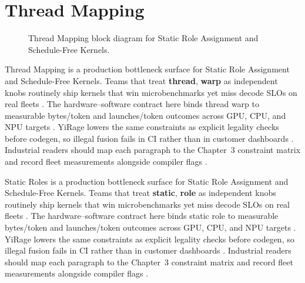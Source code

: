 \section{Thread Mapping}
\label{sec:thread_mapping}
\begin{figure}[t]
\centering
{}
\caption{Thread Mapping block diagram for Static Role Assignment and Schedule-Free Kernels.}
\label{fig:thread_mapping_architecture}
\end{figure}


Thread Mapping is a production bottleneck surface for Static Role Assignment and Schedule-Free Kernels. Teams that treat \textbf{thread}, \textbf{warp} as independent knobs routinely ship kernels that win microbenchmarks yet miss decode SLOs on real fleets \citep{taxbreak2026,semianalysis2024tma}. The hardware--software contract here binds thread warp to measurable bytes/token and launches/token outcomes across GPU, CPU, and NPU targets \citep{memoryfloor2026,amd2024xdna}. YiRage lowers the same constraints as explicit legality checks before codegen, so illegal fusion fails in CI rather than in customer dashboards \citep{nvidia2022hopper,amd2024aie}. Industrial readers should map each paragraph to the Chapter~3 constraint matrix and record fleet measurements alongside compiler flags \citep{semianalysis2024tma,dlbook}.

Static Roles is a production bottleneck surface for Static Role Assignment and Schedule-Free Kernels. Teams that treat \textbf{static}, \textbf{role} as independent knobs routinely ship kernels that win microbenchmarks yet miss decode SLOs on real fleets \citep{liu2024deepseekv3,memoryfloor2026}. The hardware--software contract here binds static role to measurable bytes/token and launches/token outcomes across GPU, CPU, and NPU targets \citep{patel2025llminference,nvidia2022hopper}. YiRage lowers the same constraints as explicit legality checks before codegen, so illegal fusion fails in CI rather than in customer dashboards \citep{taxbreak2026,semianalysis2024tma}. Industrial readers should map each paragraph to the Chapter~3 constraint matrix and record fleet measurements alongside compiler flags \citep{memoryfloor2026,amd2024xdna}.

